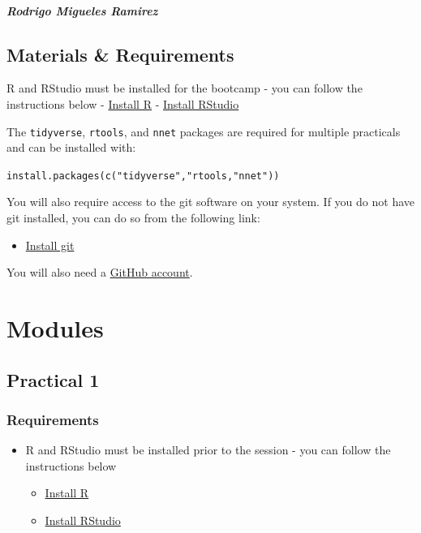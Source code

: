 \documentclass[
]{book}
\providecommand{\tightlist}{%
  \setlength{\itemsep}{0pt}\setlength{\parskip}{0pt}}
\begin{document}
\subsubsection{Rodrigo Migueles Ramirez}\label{rodrigo-migueles-ramirez}

\chapter{Materials \& Requirements}\label{materials-requirements}

R and RStudio must be installed for the bootcamp - you can follow the instructions below - \href{https://cran.r-project.org/}{Install R} - \href{https://posit.co/download/rstudio-desktop/}{Install RStudio}

The \texttt{tidyverse}, \texttt{rtools}, and \texttt{nnet} packages are required for multiple practicals and can be installed with:

\texttt{install.packages(c("tidyverse","rtools,"nnet"))}

You will also require access to the git software on your system. If you do not have git installed, you can do so from the following link:

\begin{itemize}
\tightlist
\item
  \href{https://git-scm.com/book/en/v2/Getting-Started-Installing-Git}{Install git}
\end{itemize}

You will also need a \href{http://github.com/}{GitHub account}.

\part{Modules}\label{part-modules}

\chapter{Practical 1}\label{practical-1}

\section{Requirements}\label{requirements}

\begin{itemize}
\tightlist
\item
  R and RStudio must be installed prior to the session - you can follow the instructions below

  \begin{itemize}
  \tightlist
  \item
    \href{https://cran.r-project.org/}{Install R}
  \item
    \href{https://posit.co/download/rstudio-desktop/}{Install RStudio}
  \end{itemize}
\end{itemize}
\end{document}
